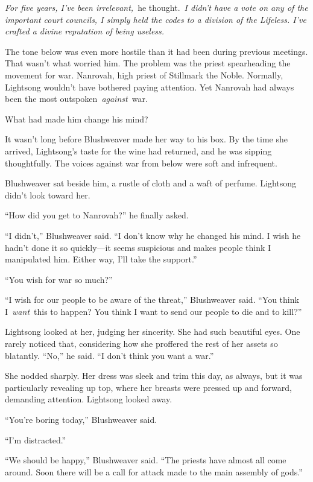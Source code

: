 \textit{For five years, I’ve been irrelevant,}~he thought.~\textit{I didn’t have a vote on any of the important court councils, I simply held the codes to a division of the Lifeless. I’ve crafted a divine reputation of being useless.}

The tone below was even more hostile than it had been during previous meetings. That wasn’t what worried him. The problem was the priest spearheading the movement for war. Nanrovah, high priest of Stillmark the Noble. Normally, Lightsong wouldn’t have bothered paying attention. Yet Nanrovah had always been the most outspoken~\textit{against}~war.

What had made him change his mind?

It wasn’t long before Blushweaver made her way to his box. By the time she arrived, Lightsong’s taste for the wine had returned, and he was sipping thoughtfully. The voices against war from below were soft and infrequent.

Blushweaver sat beside him, a rustle of cloth and a waft of perfume. Lightsong didn’t look toward her.

“How did you get to Nanrovah?” he finally asked.

“I didn’t,” Blushweaver said. “I don’t know why he changed his mind. I wish he hadn’t done it so quickly—it seems suspicious and makes people think I manipulated him. Either way, I’ll take the support.”

“You wish for war so much?”

“I wish for our people to be aware of the threat,” Blushweaver said. “You think I~\textit{want}~this to happen? You think I want to send our people to die and to kill?”

Lightsong looked at her, judging her sincerity. She had such beautiful eyes. One rarely noticed that, considering how she proffered the rest of her assets so blatantly. “No,” he said. “I don’t think you want a war.”

She nodded sharply. Her dress was sleek and trim this day, as always, but it was particularly revealing up top, where her breasts were pressed up and forward, demanding attention. Lightsong looked away.

“You’re boring today,” Blushweaver said.

“I’m distracted.”

“We should be happy,” Blushweaver said. “The priests have almost all come around. Soon there will be a call for attack made to the main assembly of gods.”

